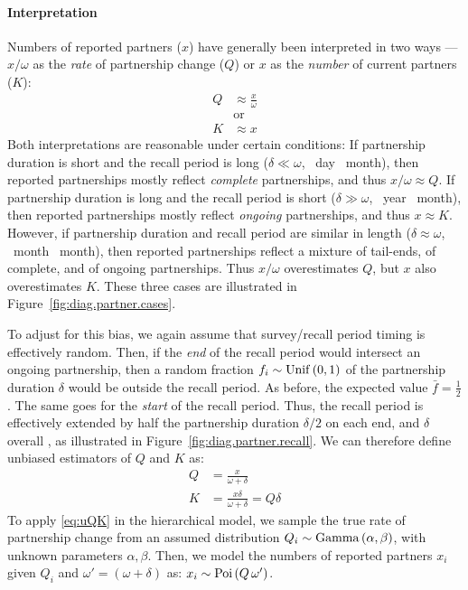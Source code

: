 \paragraph{Interpretation}
Numbers of reported partners ($x$) have generally been interpreted in two ways ---
$x/\omega$ as the \emph{rate} of partnership change ($Q$) or
$x$ as the \emph{number} of current partners ($K$):
\begin{subequations}\label{eq:bQK}
\begin{alignat}{1}
  Q &\approx \frac{x}{\omega} \label{eq:bQ}\\
    &\text{or} \nonumber\\
  K &\approx x \label{eq:bK}
\end{alignat}
\end{subequations}
Both interpretations are reasonable under certain conditions:
If partnership duration is short and the recall period is long
($\delta \ll \omega$, ~day ~month),
then reported partnerships mostly reflect \emph{complete} partnerships,
and thus $x/\omega \approx Q$.
If partnership duration is long and the recall period is short
($\delta \gg \omega$, ~year ~month),
then reported partnerships mostly reflect \emph{ongoing} partnerships,
and thus $x \approx K$.
However, if partnership duration and recall period are similar in length
($\delta \approx \omega$, ~month ~month),
then reported partnerships reflect a mixture of tail-ends, of complete, and of ongoing partnerships.
Thus $x/\omega$ overestimates $Q$, but $x$ also overestimates $K$.
These three cases are illustrated in Figure~\ref{fig:diag.partner.cases}.
\par
To adjust for this bias, we again assume that survey/recall period timing is effectively random.
Then, if the \emph{end} of the recall period would intersect an ongoing partnership,
then a random fraction $f_i \sim \mathrm{Unif}\,(0,1)$ of the partnership duration $\delta$
would be outside the recall period.
As before, the expected value $\bar{f} = \frac12$.
The same goes for the \emph{start} of the recall period.
Thus, the recall period is effectively extended by
half the partnership duration $\delta/2$ on each end, and $\delta$ overall \cite{Neely2023},
as illustrated in Figure~\ref{fig:diag.partner.recall}.
We can therefore define unbiased estimators of $Q$ and $K$ as:
\begin{subequations}\label{eq:uQK}
\begin{alignat}{1}
  Q &= \frac{x}{\omega + \delta}\\
  K &= \frac{x \delta}{\omega + \delta} = Q \delta
\end{alignat}
\end{subequations}
To apply \eqref{eq:uQK} in the hierarchical model, we sample the true rate of partnership change
from an assumed distribution $Q_i \sim \mathrm{Gamma}\,(\alpha,\beta)$,
with unknown parameters $\alpha, \beta$.
Then, we model the numbers of reported partners $x_i$
given $Q_i$ and $\omega' = (\omega + \delta)$ as: $x_i \sim \mathrm{Poi}\,(Q\,\omega')$.

